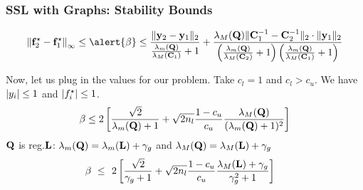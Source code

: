 \documentclass{beamer}
\begin{document}
\begin{frame}
\frametitle{SSL with Graphs: Stability Bounds}
\[
 \norminf{\bff_2^\star - \bff_1^\star} 
\leq  \alert{\beta} \leq \frac{\normtwo{\by_2 - \by_1}}{\frac{\lambda_m(\bQ)}{\lambda_M(\bC_1)} + 1}
 + \frac{\lambda_M(\bQ) \normtwo{\bC_1^{-1}-\bC_2^{-1}
}  \cdot \normtwo{\by_1}}{\left( \frac{\lambda_m(\bQ)}{\lambda_M(\bC_2)} + 1 \right)
\left(  \frac{\lambda_m(\bQ)}{\lambda_M(\bC_1)} + 1  \right)}
\]

\pause
Now, let us plug in the values for our problem.
\pause
\moveb
Take $c_l = 1$ \pause and $c_l > c_u$. \pause
We have $\left|y_i\right| \leq 1$ \pause and $\left|f_i^\star\right| \leq 1$. \pause
\begin{align*}
  \beta \leq 2 \left[\frac{\sqrt{2}}{\lambda_m(\mathbf{Q}) + 1} +
  \sqrt{2 n_l} \frac{1 - c_u}{c_u}
  \frac{\lambda_M(\mathbf{Q})}{(\lambda_m(\mathbf{Q}) + 1)^2}\right]
\end{align*}
\pause 
$\mathbf{Q}$ is reg.\@ $\mathbf{L}$:
$\lambda_m(\mathbf{Q}) = \lambda_m(\mathbf{L}) + \gamma_g$
\pause and 
$\lambda_M(\mathbf{Q}) = \lambda_M(\mathbf{L}) + \gamma_g$
\pause
\begin{align*}  
  \beta \ \leq & \ \
  2 \left[\frac{\sqrt{2}}{\gamma_g + 1} +
  \sqrt{2 n_l} \frac{1 - c_u}{c_u}
  \frac{\lambda_M(\mathbf{L}) + \gamma_g}{\gamma_g^2 + 1}\right]
\end{align*}
\pause
{}

\end{frame}
\end{document}
